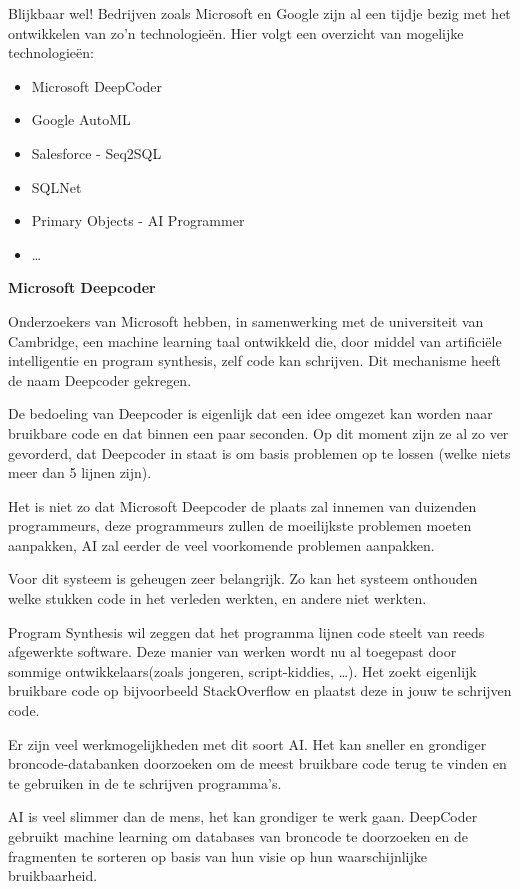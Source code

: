 Blijkbaar wel! Bedrijven zoals Microsoft en Google zijn al een tijdje bezig met het ontwikkelen van zo'n technologieën. Hier volgt een overzicht van mogelijke technologieën:
\begin{itemize}
	\item Microsoft DeepCoder
	\item Google AutoML
	\item Salesforce - Seq2SQL
	\item SQLNet
	\item Primary Objects - AI Programmer
	\item \ldots
\end{itemize}

\textbf{Microsoft Deepcoder}

Onderzoekers van Microsoft hebben, in samenwerking met de universiteit van Cambridge, een machine learning taal ontwikkeld die, door middel van artificiële intelligentie en program synthesis, zelf code kan schrijven. Dit mechanisme heeft de naam Deepcoder gekregen.

De bedoeling van Deepcoder is eigenlijk dat een idee omgezet kan worden naar bruikbare code en dat binnen een paar seconden. Op dit moment zijn ze al zo ver gevorderd, dat Deepcoder in staat is om basis problemen op te lossen (welke niets meer dan 5 lijnen zijn).

Het is niet zo dat Microsoft Deepcoder de plaats zal innemen van duizenden programmeurs, deze programmeurs zullen de moeilijkste problemen moeten aanpakken, AI zal eerder de veel voorkomende problemen aanpakken. 

Voor dit systeem is geheugen zeer belangrijk. Zo kan het systeem onthouden welke stukken code in het verleden werkten, en andere niet werkten.

Program Synthesis wil zeggen dat het programma lijnen code steelt van reeds afgewerkte software. Deze manier van werken wordt nu al toegepast door sommige ontwikkelaars(zoals jongeren, script-kiddies, …). Het zoekt eigenlijk bruikbare code op bijvoorbeeld StackOverflow en plaatst deze in jouw te schrijven code.

Er zijn veel werkmogelijkheden met dit soort AI. Het kan sneller en grondiger broncode-databanken doorzoeken om de meest bruikbare code terug te vinden en te gebruiken in de te schrijven programma’s. 

AI is veel slimmer dan de mens, het kan grondiger te werk gaan. DeepCoder gebruikt machine learning om databases van broncode te doorzoeken en de fragmenten te sorteren op basis van hun visie op hun waarschijnlijke bruikbaarheid.

